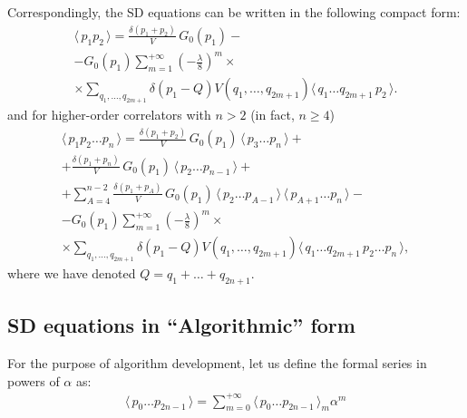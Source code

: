 \documentclass[12pt]{article}
\newcommand{\lr}[1]{ \left( #1 \right) }
\newcommand{\vev}[1]{ \langle \, #1 \, \rangle }
\begin{document}
Correspondingly, the SD equations can be written in the following compact form:
\begin{eqnarray}
\label{sd_eqs_G2_mom_vertex}
 \vev{p_1 p_2} = \frac{\delta\lr{p_1 + p_2}}{V} \, G_0\lr{p_1}
 - \nonumber \\ -
 G_0\lr{p_1} \sum\limits_{m=1}^{+\infty}
 \lr{-\frac{\lambda}{8}}^m
 \times \nonumber \\ \times
 \sum\limits_{q_1, \ldots, q_{2 m + 1}}
 \delta\lr{p_1 - Q}
 V\lr{q_1, \ldots, q_{2 m + 1}}
 \vev{q_1 \ldots q_{2 m + 1} \, p_2} .
\end{eqnarray}
and for higher-order correlators with $n > 2$ (in fact, $n \geq 4$)
\begin{eqnarray}
\label{sd_eqs_Gn_mom_vertex}
 \vev{p_1 p_2 \ldots p_n}
 =
 \frac{\delta\lr{p_1 + p_2}}{V} \, G_0\lr{p_1} \, \vev{p_3 \ldots p_n}
 + \nonumber \\ +
 \frac{\delta\lr{p_1 + p_n}}{V} \, G_0\lr{p_1} \, \vev{p_2 \ldots p_{n-1}}
 + \nonumber \\ +
 \sum\limits_{A=4}^{n-2}
 \frac{\delta\lr{p_1 + p_A}}{V} \, G_0\lr{p_1} \,
 \vev{p_2 \ldots p_{A-1}} \, \vev{p_{A+1} \ldots p_n}
 - \nonumber \\ -
 G_0\lr{p_1} \sum\limits_{m=1}^{+\infty}
 \lr{-\frac{\lambda}{8}}^m
 \times \nonumber \\ \times
 \sum\limits_{q_1, \ldots, q_{2 m + 1}}
 \delta\lr{p_1 - Q}
 V\lr{q_1, \ldots, q_{2 m + 1}}
 \vev{q_1 \ldots q_{2 m + 1} \, p_2  \ldots p_n} ,
\end{eqnarray}
where we have denoted $Q = q_1 + \ldots + q_{2 n + 1}$.

\subsection{SD equations in ``Algorithmic'' form}
\label{subsec:sds_algorithmic}

 For the purpose of algorithm development, let us define the formal series in powers of $\alpha$ as:
\begin{eqnarray}
\label{alpha_series_def}
 \vev{p_0 \ldots p_{2 n - 1}}
 =
 \sum\limits_{m=0}^{+\infty}
 \vev{p_0 \ldots p_{2 n - 1}}_m \alpha^m
\end{eqnarray}
\end{document}
